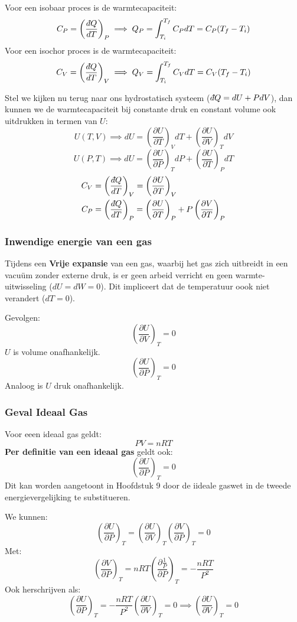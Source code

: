 Voor een isobaar proces is de warmtecapaciteit:
\[C_P = \left( \frac{\dbar Q}{dT} \right)_P \implies Q_P = \int_{T_i}^{T_f} C_P dT = C_P (T_f - T_i)\]
Voor een isochor proces is de warmtecapaciteit:
\[C_V = \left( \frac{\dbar Q}{dT} \right)_V \implies Q_V = \int_{T_i}^{T_f} C_V dT = C_V (T_f - T_i)\]

Stel we kijken nu terug naar ons hydrostatisch systeem (\(\dbar Q = dU+PdV\)), dan kunnen we de warmtecapaciteit bij constante druk en constant volume ook uitdrukken in termen van \(U\):
\[U(T,V) \implies dU = \left( \frac{\partial U}{\partial T} \right)_V dT + \left( \frac{\partial U}{\partial V} \right)_T dV\]
\[U(P,T) \implies dU = \left( \frac{\partial U}{\partial P} \right)_T dP + \left( \frac{\partial U}{\partial T} \right)_P dT\]
\begin{align*}
    C_V &= \left( \frac{\dbar Q}{dT} \right)_V = \left( \frac{\partial U}{\partial T} \right)_V \\
    C_P &= \left( \frac{\dbar Q}{dT} \right)_P = \left( \frac{\partial U}{\partial T} \right)_P + P \left( \frac{\partial V}{\partial T} \right)_P
\end{align*}

\subsubsection{Inwendige energie van een gas}

Tijdens een \textbf{Vrije expansie} van een gas, waarbij het gas zich uitbreidt in een vacuüm zonder externe druk, is er geen arbeid verricht en geen warmte-uitwisseling (\(dU = dW = 0\)).
Dit impliceert dat de temperatuur oook niet verandert (\(dT = 0\)).

Gevolgen:
\[\left( \frac{\partial U}{\partial V} \right)_T = 0\]
\(U\) is volume onafhankelijk.
\[\left( \frac{\partial U}{\partial P} \right)_T = 0\]
Analoog is \(U\) druk onafhankelijk.

\subsubsection{Geval Ideaal Gas}

Voor eeen ideaal gas geldt:
\[PV = nRT\]
\textbf{Per definitie van een ideaal gas} geldt ook:
\[\left( \frac{\partial U}{\partial P} \right)_T = 0\]
Dit kan worden aangetoont in Hoofdstuk 9 door de iideale gaswet in de tweede energievergelijking te substitueren.

We kunnen:
\[\left( \frac{\partial U}{\partial P} \right)_T = \left( \frac{\partial U}{\partial V} \right)_T \left( \frac{\partial V}{\partial P} \right)_T  = 0\]
Met:
\[\left( \frac{\partial V}{\partial P} \right)_T = nRT\left( \frac{\partial \frac{1}{P}}{\partial P} \right)_T =-\frac{nRT}{P^2}\]
Ook herschrijven als:
\[\left( \frac{\partial U}{\partial P} \right)_T = -\frac{nRT}{P^2} \left( \frac{\partial U}{\partial V} \right)_T = 0 \implies \left(\frac{\partial U}{\partial V}\right)_T = 0\]

